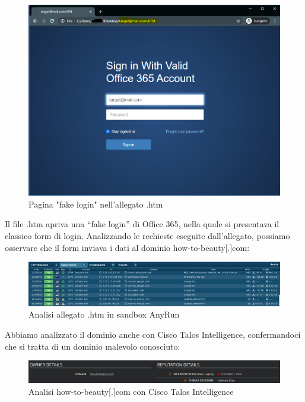\begin{figure}[h]
    \begin{center}
        \includegraphics[width=0.80\columnwidth]{images/4_caso_d'uso_img/attacched.png}
    \end{center}
    \caption{Pagina "fake login" nell'allegato .htm}
    \label{fig:Pagina "fake login" nell'allegato .htm}
\end{figure} 

Il file .htm apriva una “fake login” di Office 365, nella quale si presentava il classico form di login.
Analizzando le rechieste eseguite dall’allegato, possiamo osservare che il form inviava i dati al dominio how-to-beauty[.]com: 

\begin{figure}[h]
    \begin{center}
        \includegraphics[width=0.98\columnwidth]{images/4_caso_d'uso_img/sandbox.jpg}
    \end{center}
    \caption{Analisi allegato .htm in sandbox AnyRun}
    \label{fig:Analisi allegato .htm in sandbox AnyRun}
\end{figure} 

\newpage

Abbiamo analizzato il dominio anche con Cisco Talos Intelligence, confermandoci che si tratta di un dominio malevolo conosciuto:

\begin{figure}[h]
    \begin{center}
        \includegraphics[width=0.98\columnwidth]{images/4_caso_d'uso_img/talosdomain3.png}
    \end{center}
    \caption{Analisi how-to-beauty[.]com con Cisco Talos Intelligence}
    \label{fig:Analisi how-to-beauty[.]com con Cisco Talos Intelligence}
\end{figure} 

